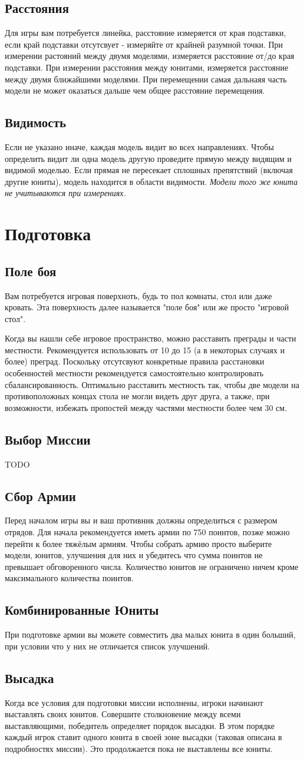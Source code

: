 \documentclass[twocolumn]{article}
\newcommand{\TODO}{\begin{center}\color{red}TODO\end{center}}
\newcommand{\ssec}[1]{\section{#1}\label{sec:#1}}
\newcommand{\subsec}[1]{\subsection{#1}\label{subsec:#1}}
\begin{document}
\subsec{Расстояния}
Для игры вам потребуется линейка, расстояние измеряется от края подставки, если край подставки отсутсвует - измеряйте от крайней разумной точки. При измерении растояний между двумя моделями, измеряется расстояние от/до края подставки. При измерении расстояния между юнитами, измеряется расстояние между двумя ближайшими моделями. При перемещении самая дальнаяя часть модели не может оказаться дальше чем общее расстояние перемещения.

\subsec{Видимость}
Если не указано иначе, каждая модель видит во всех направлениях. Чтобы определить видит ли одна модель другую проведите прямую между видящим и видимой моделью. Если прямая не пересекает сплошных препятствий (включая другие юниты), модель находится в области видимости. \emph{Модели того же юнита не учитываются при измерениях.}

\newpage

\ssec{Подготовка}
\subsec{Поле боя}
Вам потребуется игровая поверхноть, будь то пол комнаты, стол или даже кровать. Эта поверхность далее называется "поле боя" или же просто "игровой стол".

Когда вы нашли себе игровое пространство, можно расставить преграды и части местности. Рекомендуется использовать от 10 до 15 (а в некоторых случаях и более) преград. Поскольку отсутсвуют конкретные правила расстановки особенностей местности рекомендуется самостоятельно контролировать сбалансированность. Оптимально расставить местность так, чтобы две модели на противоположных концах стола не могли видеть друг друга, а также, при возможности, избежать пропостей между частями местности более чем 30 см.

\subsec{Выбор Миссии}
\TODO

\subsec{Сбор Армии}
Перед началом игры вы и ваш противник должны определиться с размером отрядов. Для начала рекомендуется иметь армии по 750 поинтов, позже можно перейти к более тяжёлым армиям. Чтобы собрать армию просто выберите модели, юнитов, улучшения для них и убедитесь что сумма поинтов не превышает обговоренного числа. Количество юнитов не ограничено ничем кроме максимального количества поинтов.

\subsec{Комбинированные Юниты}
При подготовке армии вы можете совместить два малых юнита в один больший, при условии что у них не отличается список улучшений.

\subsec{Высадка}
Когда все условия для подготовки миссии исполнены, игроки начинают выставлять своих юнитов. Совершите столкновение между всеми выставляющими, победитель определяет порядок высадки. В этом порядке каждый игрок ставит одного юнита в своей зоне высадки (таковая описана в подробностях миссии). Это продолжается пока не выставлены все юниты.
\end{document}
